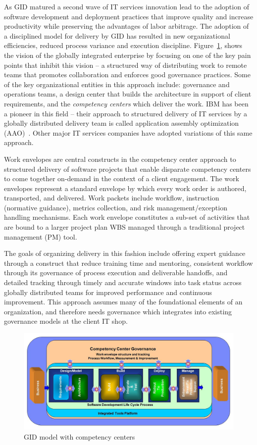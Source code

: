 As GID matured a second wave of IT services innovation lead to the adoption of software development and deployment practices that improve quality and increase productivity while preserving the advantages of labor arbitrage.  The adoption of a disciplined model for delivery by GID has resulted in new organizational efficiencies, reduced process variance and execution discipline. Figure~\ref{glofig1}, shows the vision of the globally integrated enterprise by focusing on one of the key pain points that inhibit this vision -- a structured way of distributing work to remote teams that promotes collaboration and enforces good governance practices.  Some of the key organizational entities in this approach include: governance and operations teams, a design center that builds the architecture in support of client requirements, and the \textit{competency centers} which deliver the work. IBM has been a pioneer in this field -- their approach to structured delivery of IT services by a globally distributed delivery team is called application assembly optimization (AAO)~\cite{gloaao}. Other major IT services companies have adopted variations of this same approach.

Work envelopes are central constructs in the competency center approach to structured delivery of software projects that enable disparate competency centers to come together on-demand in the context of a client engagement.  The work envelopes represent a standard envelope by which every work order is authored, transported, and delivered. Work packets include workflow, instruction (normative guidance), metrics collection, and risk management/exception handling mechanisms. Each work envelope constitutes a sub-set of activities that are bound to a larger project plan WBS managed through a traditional project management (PM) tool.

The goals of organizing delivery in this fashion include offering expert guidance through a construct that reduce training time and mentoring, consistent workflow through its governance of process execution and deliverable handoffs, and detailed tracking through timely and accurate windows into task status across globally distributed teams for improved performance and continuous improvement. This approach assumes many of the foundational elements of an organization, and therefore needs governance which integrates into existing governance models at the client IT shop.

\begin{figure}[H]
\centering
\includegraphics[bb= 0 0 750 350, scale=0.30]{figs/glocomp.jpg}
\caption{GID model with competency centers}
\label{glofig1}
\end{figure}


